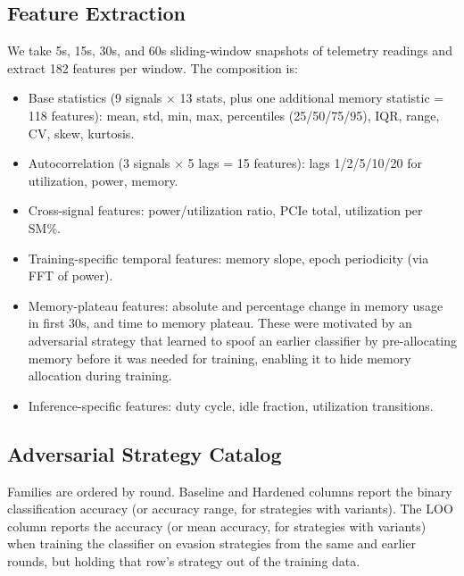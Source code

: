 \subsection{Feature Extraction}
\label{sec:feat}

We take 5s, 15s, 30s, and 60s sliding-window snapshots of telemetry readings and extract 182 features per window. The composition is:

\begin{itemize}\itemsep2pt
  \item Base statistics (9 signals $\times$ 13 stats, plus one additional memory statistic = 118 features): mean, std, min, max, percentiles (25/50/75/95), IQR, range, CV, skew, kurtosis.
  \item Autocorrelation (3 signals $\times$ 5 lags = 15 features): lags 1/2/5/10/20 for utilization, power, memory.
  \item Cross-signal features: power/utilization ratio, PCIe total, utilization per SM\%.
  \item Training-specific temporal features: memory slope, epoch periodicity (via FFT of power).
  \item Memory-plateau features: absolute and percentage change in memory usage in first 30s, and time to memory plateau. These were motivated by an adversarial strategy that learned to spoof an earlier classifier by pre-allocating memory before it was needed for training, enabling it to hide memory allocation during training.
  \item Inference-specific features: duty cycle, idle fraction, utilization transitions.
\end{itemize}

\subsection{Adversarial Strategy Catalog}
\label{sec:catalog}

Families are ordered by round. Baseline and Hardened columns report the binary classification accuracy (or accuracy range, for strategies with variants). The LOO column reports the accuracy (or mean accuracy, for strategies with variants) when training the classifier on evasion strategies from the same and earlier rounds, but holding that row's strategy out of the training data.

